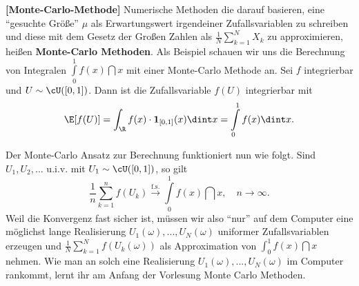 \begin{anwendung}\label{MC1}
 \textbf{[Monte-Carlo-Methode]}
	Numerische Methoden die darauf basieren, eine \enquote{gesuchte Größe} $\mu$ als Erwartungswert irgendeiner Zufallsvariablen zu schreiben und diese mit dem Gesetz der Gro\ss en Zahlen als $\frac{1}{N}\sum_{k=1}^N X_k$ zu approximieren, hei\ss en \textbf{Monte-Carlo Methoden}. Als Beispiel schauen wir uns die Berechnung von Integralen  $\int\limits_{0}^{1} f(x) \dint x$ mit einer Monte-Carlo Methode an.
Sei $f$ integrierbar und $U \sim \cU([0,1])$. Dann ist die Zufallsvariable $f(U)$ integrierbar mit \[ \E[f(U)] = \int_{\R} f(x) \cdot \mathbf{1}_{[0,1]}(x) \dint x = \int\limits_{0}^{1} f(x) \dint x. \]
	
	Der Monte-Carlo Ansatz zur Berechnung funktioniert nun wie folgt. Sind $U_1,U_2,...$ u.i.v. mit $U_1 \sim \cU([0,1])$, so gilt \[ \frac{1}{n} \sum\limits_{k=1}^{n} f(U_k) \overset{\text{f.s.}}{\longrightarrow} \int\limits_{0}^{1} f(x) \dint x,\quad n \to \infty. \]
Weil die Konvergenz fast sicher ist, m\"ussen wir also \enquote{nur} auf dem Computer eine m\"oglichst lange Realisierung $U_1(\omega), ... ,U_N(\omega)$ uniformer Zufallsvariablen erzeugen und $ \frac{1}{N} \sum\limits_{k=1}^{N} f(U_k(\omega)) $ als Approximation von $\int_0^1 f(x)\dint x$ nehmen. Wie man an solch eine Realisierung $U_1(\omega), ..., U_N(\omega)$ im Computer rankommt, lernt ihr am Anfang der Vorlesung Monte Carlo Methoden.
\end{anwendung}

